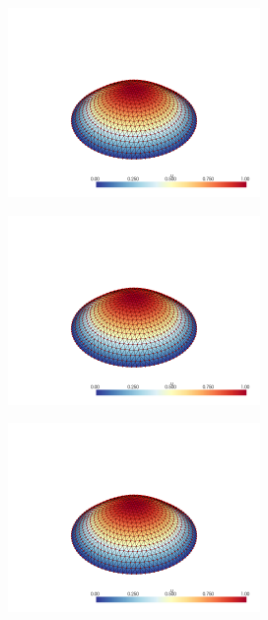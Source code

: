 \documentclass[
  11pt,
]{article}
\let\origfigure\figure
\let\endorigfigure\endfigure
\renewenvironment{figure}[1][2] {
    \expandafter\origfigure\expandafter[H]
} {
    \endorigfigure
}
\begin{document}
\begin{figure}
\centering
\includegraphics[width=0.5\textwidth,height=\textheight]{../img/mesh3-gauss02-b.png}
\caption{Finite element solution for problem 1 over mesh number 3 and
order-2 numerical integration.}
\end{figure}

\begin{figure}
\centering
\includegraphics[width=0.5\textwidth,height=\textheight]{../img/mesh3-gauss05-b.png}
\caption{Finite element solution for problem 1 over mesh number 3 and
order-5 numerical integration.}
\end{figure}

\begin{figure}
\centering
\includegraphics[width=0.5\textwidth,height=\textheight]{../img/mesh3-gauss08-b.png}
\caption{Finite element solution for problem 1 over mesh number 3 and
order-8 numerical integration.}
\end{figure}
\end{document}
